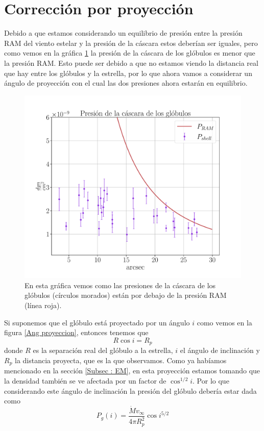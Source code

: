 \documentclass{book}
\begin{document}
\section{Corrección por proyección}\label{Sec:proyeccion}

Debido a que estamos considerando un equilibrio de presión entre la presión RAM del viento estelar y la presión de la cáscara estos deberían ser iguales, pero como vemos en la gráfica \ref{graf_presion} la presión de la cáscara de los glóbulos es menor que la presión RAM. Esto puede ser debido a que no estamos viendo la distancia real que hay entre los glóbulos y la estrella, por lo que ahora vamos a considerar un ángulo de proyección con el cual las dos presiones ahora estarán en equilibrio.

\begin{figure}[htb]
    \centering
    \includegraphics[width=\textwidth]{Nuevas imagenes finales/R_inf.pdf}
    \caption{En esta gráfica vemos como las presiones de la cáscara de los glóbulos (círculos morados) están por debajo de la presión RAM (línea roja).}
    \label{graf_presion}
\end{figure}

Si suponemos que el glóbulo está proyectado por un ángulo $i$ como vemos en la figura \ref{Ang proyeccion}, entonces tenemos que \[R\cos i=R_p\] donde $R$ es la separación real del glóbulo a la estrella, $i$ el ángulo de inclinación y $R_p$ la distancia proyecta, que es la que observamos. Como ya habíamos mencionado en la sección \ref{Subsec : EM}, en esta proyección estamos tomando que la densidad también se ve afectada por un factor de $\cos^{1/2}i$.  Por lo que considerando este ángulo de inclinación la presión del glóbulo debería estar dada como \[P_{g}(i)=\frac{\dot{M}v_\infty}{4\pi R_p^2}\cos{i}^{5/2}\]
\end{document}
